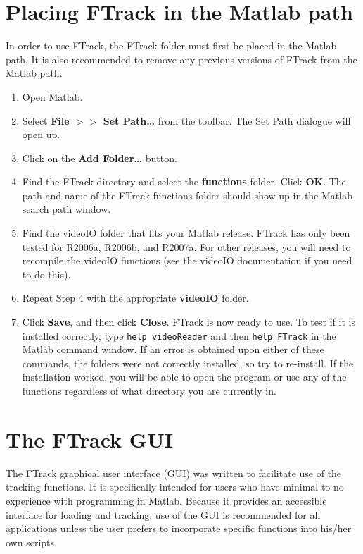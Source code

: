 \documentclass[letterpaper, 11pt]{article}
\begin{document}
\section{Placing FTrack in the Matlab path}
In order to use FTrack, the FTrack folder must first be placed in the Matlab path.  It is also
recommended to remove any previous versions of FTrack from the Matlab path.

\begin{enumerate}
\item Open Matlab.
\item Select \textbf{File $>>$ Set Path\ldots} from the toolbar.  The Set Path dialogue will open up.
\item Click on the \textbf{Add Folder\ldots} button.
\item Find the FTrack directory and select the \textbf{functions} folder. Click \textbf{OK}.  The path and name of the FTrack
functions folder should show up in the Matlab search path window.
\item Find the videoIO folder that fits your Matlab release.  FTrack has only been tested for R2006a, R2006b, and R2007a.  For other releases, you will need to recompile the videoIO functions (see the videoIO documentation if you need to do this).
\item Repeat Step 4 with the appropriate \textbf{videoIO} folder.
\item Click \textbf{Save}, and then click \textbf{Close}. FTrack is now ready to use.  To test if
it is installed correctly, type \texttt{help videoReader} and then \texttt{help FTrack} in the
Matlab command window. If an error is obtained upon either of these commands, the folders were not
correctly installed, so try to re-install.  If the installation worked, you will be able to open
the program or use any of the functions regardless of what directory you are currently in.
\end{enumerate}


\section{The FTrack GUI}
The FTrack graphical user interface (GUI) was written to facilitate use of the tracking functions.
It is specifically intended for users who have minimal-to-no experience with programming in Matlab.
Because it provides an accessible interface for loading and tracking, use of the GUI is recommended
for all applications unless the user prefers to incorporate specific functions into his/her own
scripts.
\end{document}

